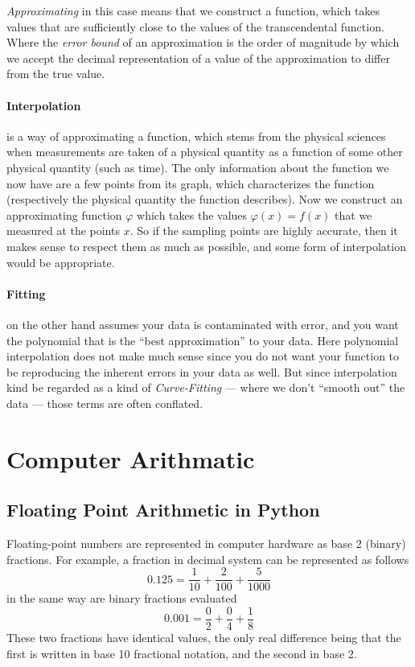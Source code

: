 \emph{Approximating} in this case means that we construct a function, which takes values that are sufficiently close to the values of the transcendental function.
Where the \emph{error bound} of an approximation is the order of magnitude by which we accept the decimal representation of a value of the approximation to differ from the true value.

\paragraph{Interpolation} is a way of approximating a function, which stems from the physical sciences when measurements are taken of a physical quantity as a function of some other physical quantity (such as time).
The only information about the function we now have are a few points from its graph, which characterizes the function (respectively the physical quantity the function describes).
Now we construct an approximating function \(\varphi\) which takes the values \(\varphi(x) = f(x)\) that we measured at the points \(x\).
So if the sampling points are highly accurate, then it makes sense to respect them as much as possible, and some form of interpolation would be appropriate.

\paragraph{Fitting} on the other hand assumes your data is contaminated with error, and you want the polynomial that is the ``best approximation'' to your data.
 Here polynomial interpolation does not make much sense since you do not want your function to be reproducing the inherent errors in your data as well.
 But since interpolation kind be regarded as a kind of \emph{Curve-Fitting} --- where we don't ``smooth out'' the data --- those terms are often conflated.

\section{Computer Arithmatic}
\subsection{Floating Point Arithmetic in Python}
Floating-point numbers are represented in computer hardware as base 2 (binary) fractions.
For example, a fraction in decimal system can be represented as follows
\[0.125 = \frac{1}{10} + \frac{2}{100} + \frac{5}{1000}\]
in the same way are binary fractions evaluated
\[0.001 = \frac{0}{2} + \frac{0}{4} + \frac{1}{8}\]
These two fractions have identical values, the only real difference being that the first is written in base 10 fractional notation, and the second in base 2.

